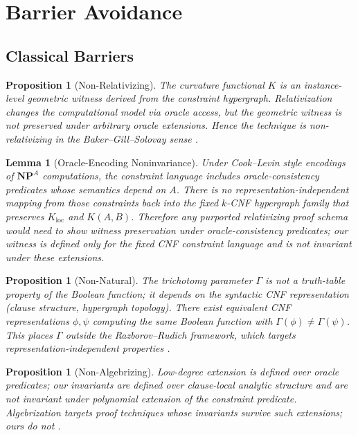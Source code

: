 \documentclass[11pt,a4paper]{article}
\theoremstyle{plain}
\newtheorem{lemma}[theorem]{Lemma}
\newtheorem{proposition}[theorem]{Proposition}
\theoremstyle{definition}
\theoremstyle{remark}
\newcommand{\NP}{\textbf{NP}}
\begin{document}

\section{Barrier Avoidance}
\label{sec:barrier}

\subsection{Classical Barriers}

\begin{proposition}[Non-Relativizing]
The curvature functional $K$ is an instance-level geometric witness derived from the constraint hypergraph. Relativization changes the computational model via oracle access, but the geometric witness is not preserved under arbitrary oracle extensions. Hence the technique is non-relativizing in the Baker--Gill--Solovay sense \cite{baker1975}.
\end{proposition}

\begin{lemma}[Oracle-Encoding Noninvariance]
Under Cook--Levin style encodings of $\NP^A$ computations, the constraint language includes oracle-consistency predicates whose semantics depend on $A$. There is no representation-independent mapping from those constraints back into the fixed $k$-CNF hypergraph family that preserves $K_{\text{loc}}$ and $K(A,B)$. Therefore any purported relativizing proof schema would need to show witness preservation under oracle-consistency predicates; our witness is defined only for the fixed CNF constraint language and is not invariant under these extensions.
\end{lemma}

\begin{proposition}[Non-Natural]
The trichotomy parameter $\Gamma$ is not a truth-table property of the Boolean function; it depends on the syntactic CNF representation (clause structure, hypergraph topology). There exist equivalent CNF representations $\phi, \psi$ computing the same Boolean function with $\Gamma(\phi) \neq \Gamma(\psi)$. This places $\Gamma$ outside the Razborov--Rudich framework, which targets representation-independent properties \cite{razborov1997}.
\end{proposition}

\begin{proposition}[Non-Algebrizing]
Low-degree extension is defined over oracle predicates; our invariants are defined over clause-local analytic structure and are not invariant under polynomial extension of the constraint predicate. Algebrization targets proof techniques whose invariants survive such extensions; ours do not \cite{aaronson2009}.
\end{proposition}
\end{document}
